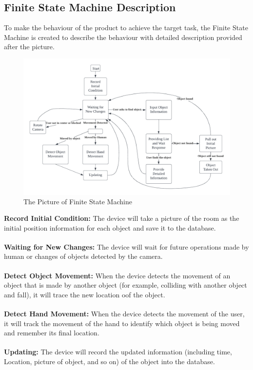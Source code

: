 \documentclass[12pt]{article}
\begin{document}
\subsection{Finite State Machine Description}
To make the behaviour of the product to achieve the target task, the Finite State Machine is created to describe the behaviour with detailed description provided after the picture. 
\begin{figure}[H]
    \centering
    \includegraphics[scale=0.7]{FSM.png}
    \caption{The Picture of Finite  State Machine}
\end{figure}
\textbf{Record Initial Condition:} The device will take a picture of the room as the initial position information for each object and save it to the database. \\\\
\textbf{Waiting for New Changes:} The device will wait for future operations made by human or changes of objects detected by the camera. \\\\
\textbf{Detect Object Movement:} When the device detects the movement of an object that is made by another object (for example, colliding with another object and fall), it will trace the new location oof the object. \\\\
\textbf{Detect Hand Movement:} When the device detects the movement of the user, it will track the movement of the hand to identify which object is being moved and remember its final location. \\\\
\textbf{Updating:} The device will record the updated information (including time, Location, picture of object, and so on) of the object into the database.\\\\
\end{document}
